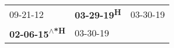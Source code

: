 \begin{supertabular}{lll}
                    09-21-12\textsuperscript{} &  \textbf{03-29-19\textsuperscript{H}} &  03-30-19\textsuperscript{} \\
 \textbf{02-06-15\textsuperscript{$\wedge$*H}} &            03-30-19\textsuperscript{} &                             \\
\end{supertabular}
